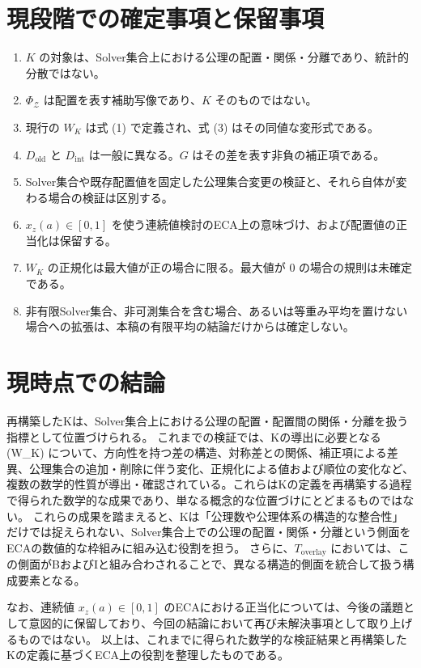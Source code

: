 \documentclass[a4paper,11pt]{ltjsarticle}
\begin{document}
\section{現段階での確定事項と保留事項}
\begin{enumerate}
\item $K$ の対象は、Solver集合上における公理の配置・関係・分離であり、統計的分散ではない。
\item $\Phi_{\mathcal{Z}}$ は配置を表す補助写像であり、$K$ そのものではない。
\item 現行の $W_K$ は式 (1) で定義され、式 (3) はその同値な変形式である。
\item $D_{\mathrm{old}}$ と $D_{\mathrm{int}}$ は一般に異なる。$G$ はその差を表す非負の補正項である。
\item Solver集合や既存配置値を固定した公理集合変更の検証と、それら自体が変わる場合の検証は区別する。
\item $x_z(a)\in[0,1]$ を使う連続値検討のECA上の意味づけ、および配置値の正当化は保留する。
\item $W_K$ の正規化は最大値が正の場合に限る。最大値が $0$ の場合の規則は未確定である。
\item 非有限Solver集合、非可測集合を含む場合、あるいは等重み平均を置けない場合への拡張は、本稿の有限平均の結論だけからは確定しない。
\end{enumerate}

\section{現時点での結論}
再構築したKは、Solver集合上における公理の配置・配置間の関係・分離を扱う指標として位置づけられる。
これまでの検証では、Kの導出に必要となる (W_K) について、方向性を持つ差の構造、対称差との関係、補正項による差異、公理集合の追加・削除に伴う変化、正規化による値および順位の変化など、複数の数学的性質が導出・確認されている。これらはKの定義を再構築する過程で得られた数学的な成果であり、単なる概念的な位置づけにとどまるものではない。
これらの成果を踏まえると、Kは「公理数や公理体系の構造的な整合性」だけでは捉えられない、Solver集合上での公理の配置・関係・分離という側面をECAの数値的な枠組みに組み込む役割を担う。
さらに、$T_{\mathrm{overlay}}$ においては、この側面がBおよびIと組み合わされることで、異なる構造的側面を統合して扱う構成要素となる。

なお、連続値 $x_z(a)\in[0,1]$ のECAにおける正当化については、今後の議題として意図的に保留しており、今回の結論において再び未解決事項として取り上げるものではない。
以上は、これまでに得られた数学的な検証結果と再構築したKの定義に基づくECA上の役割を整理したものである。
\end{document}
